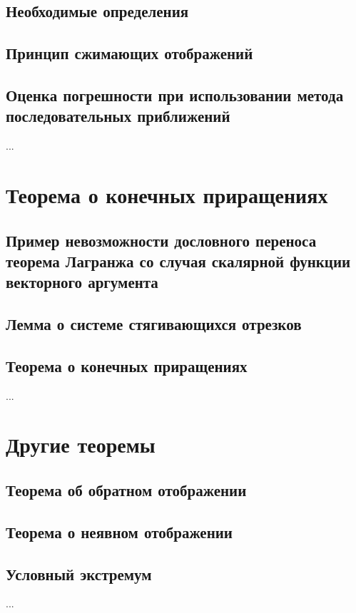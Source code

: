 \subsection{Необходимые определения}
\subsection{Принцип сжимающих отображений}
\subsection{Оценка погрешности при использовании метода последовательных приближений}
...

\section{Теорема о конечных приращениях}
\subsection{Пример невозможности дословного переноса теорема Лагранжа со случая скалярной функции векторного аргумента}

\subsection{Лемма о системе стягивающихся отрезков}
\subsection{Теорема о конечных приращениях}
...

\section{Другие теоремы}
\subsection{Теорема об обратном отображении}
\subsection{Теорема о неявном отображении}
\subsection{Условный экстремум}
...
